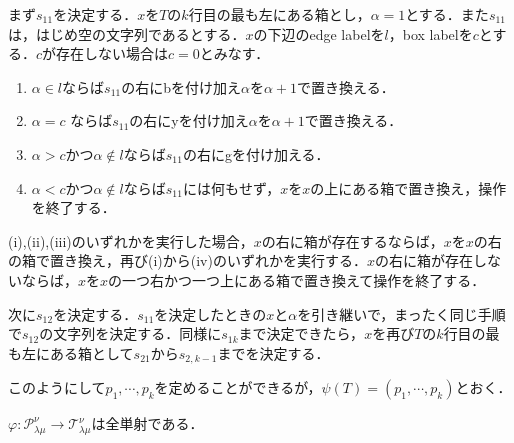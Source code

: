 まず$s_{11}$を決定する．$x$を$T$の$k$行目の最も左にある箱とし，$\alpha = 1$とする．また$s_{11}$は，はじめ空の文字列であるとする．$x$の下辺のedge labelを$l$，box labelを$c$とする．$c$が存在しない場合は$c=0$とみなす．
\begin{enumerate}
  \item $\alpha \in l$ならば$s_{11}$の右にbを付け加え$\alpha$を$\alpha+1$で置き換える．
  \item $\alpha = c$ ならば$s_{11}$の右にyを付け加え$\alpha$を$\alpha+1$で置き換える．
  \item $\alpha > c$かつ$\alpha\notin l$ならば$s_{11}$の右にgを付け加える．
  \item $\alpha < c$かつ$\alpha\notin l$ならば$s_{11}$には何もせず，$x$を$x$の上にある箱で置き換え，操作を終了する．
\end{enumerate}
(i),(ii),(iii)のいずれかを実行した場合，$x$の右に箱が存在するならば，$x$を$x$の右の箱で置き換え，再び(i)から(iv)のいずれかを実行する．$x$の右に箱が存在しないならば，$x$を$x$の一つ右かつ一つ上にある箱で置き換えて操作を終了する．

次に$s_{12}$を決定する．$s_{11}$を決定したときの$x$と$\alpha$を引き継いで，まったく同じ手順で$s_{12}$の文字列を決定する．同様に$s_{1k}$まで決定できたら，$x$を再び$T$の$k$行目の最も左にある箱として$s_{21}$から$s_{2,k-1}$までを決定する．

このようにして$p_1,\cdots,p_k$を定めることができるが，$\psi(T)=(p_1,\cdots,p_k)$とおく．


\begin{prop}
  $\varphi\colon\mathcal{P}^\nu_{\lambda\mu}\rightarrow\mathcal{T}^\nu_{\lambda\mu}$は全単射である．
\end{prop}

